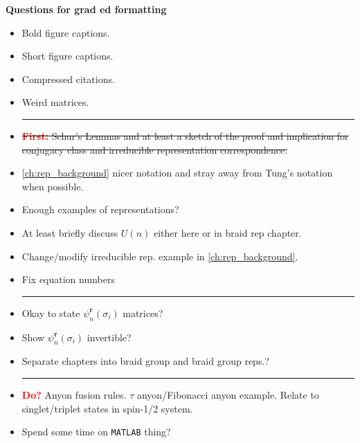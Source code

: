 \textbf{Questions for grad ed formatting}
\begin{itemize}
    \item Bold figure captions.
    \item Short figure captions.
    \item Compressed citations.
    \item Weird matrices.

    \begin{center}\rule{.85\textwidth}{0.65pt}\end{center}

    \item \sout{\textbf{\textcolor{red}{First:}} Schur's Lemmas and at least a sketch of the proof and implication for conjugacy class and irreducible representation correspondence.}
    \item \cref{ch:rep_background} nicer notation and stray away from Tung's notation when possible.
    \item Enough examples of representations?
    \item At least briefly discuss $U(n)$ either here or in braid rep chapter.
    \item Change/modify irreducible rep. example in \cref{ch:rep_background}.
    \item Fix equation numbers
    
    \begin{center}\rule{.85\textwidth}{0.65pt}\end{center}
    
    \item Okay to state $\psi_n^\textbf{r}(\sigma_i)$ matrices?
    \item Show $\psi_n^\textbf{r}(\sigma_i)$ invertible?
    \item Separate chapters into braid group and braid group reps.?
    
    \begin{center}\rule{.85\textwidth}{0.65pt}\end{center}
    
    \item \textbf{\textcolor{red}{Do?}} Anyon fusion rules. $\tau$ anyon/Fibonacci anyon example. Relate to singlet/triplet states in spin-1/2 system.
    \item Spend some time on \texttt{MATLAB} thing?


\end{itemize}
